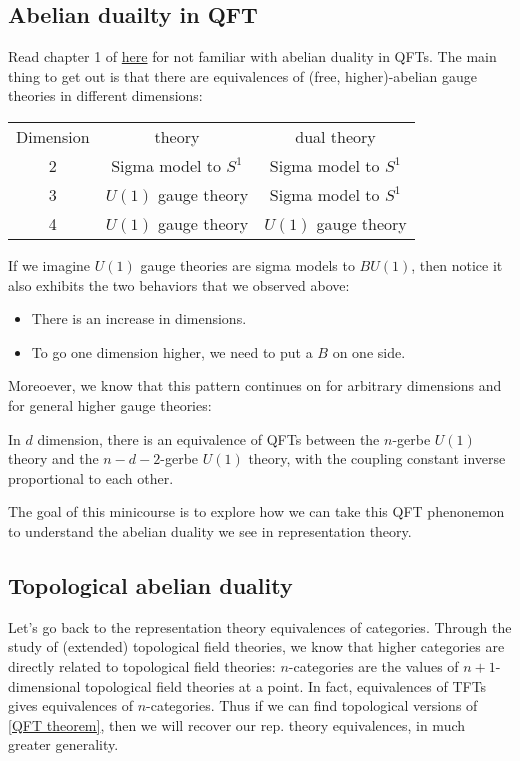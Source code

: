 \documentclass[./main]{subfiles}
\begin{document}
\subsection{Abelian duailty in QFT}
Read chapter 1 of  \href{https://leon2k2k2k.github.io/Research/senior_thesis.pdf}{here} for not familiar with abelian duality in QFTs.
The main thing to get out is that there are equivalences of (free, higher)-abelian gauge theories in different dimensions:
\begin{center}
    \begin{tabular}{c c c}
        Dimension & theory & dual theory \\ 
        2 & Sigma model to $S^1$ & Sigma model to $S^1$ \\
        3 & $U(1)$ gauge theory & Sigma model to $S^1$ \\ 
        4 & $U(1)$ gauge theory & $U(1)$ gauge theory \\
    \end{tabular}
\end{center}
If we imagine $U(1)$ gauge theories are sigma models to $BU(1)$, then
notice it also exhibits the two behaviors that we observed above:
\begin{itemize}
    \item There is an increase in dimensions.
    \item To go one dimension higher, we need to put a $B$ on one side.
\end{itemize}
Moreoever, we know that this pattern continues on for arbitrary dimensions  and for general higher gauge theories:
\begin{theorem} \label{QFT theorem}
    In $d$ dimension, there is an equivalence of QFTs between the $n$-gerbe $U(1)$ theory
    and the $n-d-2$-gerbe $U(1)$ theory, with the coupling constant inverse proportional to each other.
\end{theorem}
The goal of this minicourse is to explore how we can take this QFT phenonemon to understand the abelian duality
we see in representation theory.

\subsection{Topological abelian duality}
Let's go back to the representation theory equivalences of categories. 
Through the study of (extended) topological field theories, we know that higher categories are directly related to 
topological field theories: $n$-categories are the values of $n+1$-dimensional topological field theories
at a point. In fact, equivalences of TFTs gives equivalences of $n$-categories. Thus if we can find topological versions
of \ref{QFT theorem}, then we will recover our rep. theory equivalences, in much greater generality.
\end{document}
